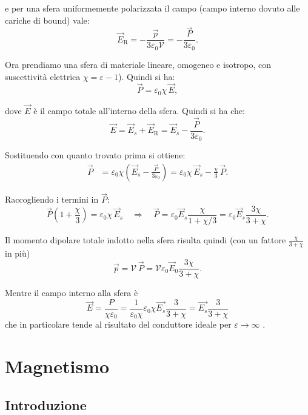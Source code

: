 \documentclass{book}
\begin{document}
e per una sfera uniformemente polarizzata il campo (campo interno dovuto alle cariche di bound) vale:
\begin{equation}
\vec E_{\mathrm{R}} = -\frac{\vec p}{3\varepsilon_0\mathcal V} = -\frac{\vec P}{3\varepsilon_0}.
\end{equation}

Ora prendiamo una sfera di materiale lineare, omogeneo e isotropo, con suscettivit\`a elettrica $\chi=\varepsilon-1$). Quindi si ha:
\begin{equation}
\vec P = \varepsilon_0\chi\,\vec E,
\end{equation}

dove $\vec E$ \`e il campo totale all'interno della sfera. Quindi si ha che:
\begin{equation}
\vec E = \vec E_s + \vec E_{\mathrm{R}} = \vec E_s - \frac{\vec P}{3\varepsilon_0}.
\end{equation}

Sostituendo con quanto trovato prima si ottiene:
\begin{align}
\vec P &= \varepsilon_0\chi\left(\vec E_s - \frac{\vec P}{3\varepsilon_0}\right)
= \varepsilon_0\chi\,\vec E_s - \frac{\chi}{3}\,\vec P.
\end{align}

Raccogliendo i termini in $\vec P$:
\begin{equation}
\vec P\left(1+\frac{\chi}{3}\right) = \varepsilon_0\chi\,\vec E_s
\quad\Rightarrow\quad
\vec P = \varepsilon_0\vec E_s\frac{\chi}{1+\chi/3} = \varepsilon_0\vec E_s\frac{3\chi}{3+\chi}.
\end{equation}

Il momento dipolare totale indotto nella sfera risulta quindi (con un fattore $\frac{\chi}{3+\chi}$ in più)
\begin{equation}
\vec p = \mathcal V\,\vec P = \mathcal V\varepsilon_0\vec E_0\frac{3\chi}{3+\chi}.
\end{equation}

Mentre il campo interno alla sfera \`e
$$
\vec{E}=\frac{P}{\chi\varepsilon_0}=\frac{1}{\varepsilon_0\chi}\varepsilon_0\chi\vec{E_s}\frac{3}{3+\chi}= \vec{E_s}\frac{3}{3+\chi}
$$
che in particolare tende al risultato del conduttore ideale per $\varepsilon\to\infty$ .

\chapter{Magnetismo}
\section{Introduzione}
\end{document}
